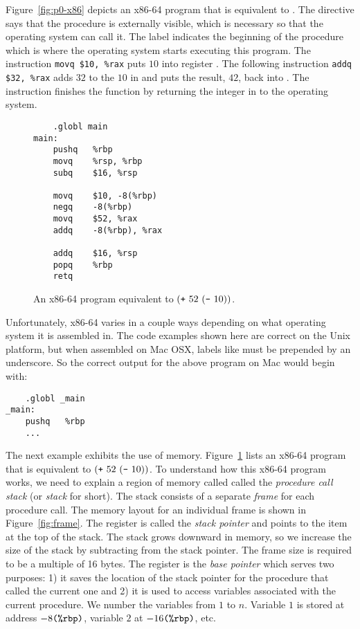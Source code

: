 \documentclass[11pt]{book}
\begin{document}
Figure~\ref{fig:p0-x86} depicts an x86-64 program that is equivalent
to . The  directive says that the
 procedure is externally visible, which is necessary so
that the operating system can call it. The label 
indicates the beginning of the  procedure which is where
the operating system starts executing this program.  The instruction
\lstinline{movq $10, %rax} puts $10$ into register . The
following instruction \lstinline{addq $32, %rax} adds $32$ to the
$10$ in  and puts the result, $42$, back into
. The instruction  finishes the 
function by returning the integer in  to the
operating system.


\begin{wrapfigure}{r}{2.25in}
\begin{lstlisting}
	.globl main
main:
	pushq	%rbp
	movq	%rsp, %rbp
	subq	$16, %rsp

	movq	$10, -8(%rbp)
	negq	-8(%rbp)
	movq	$52, %rax
	addq	-8(%rbp), %rax

	addq	$16, %rsp
	popq	%rbp
	retq
\end{lstlisting}
\caption{An x86-64 program equivalent to $(\texttt{+}~52~(\texttt{-}~10) )$.}
\label{fig:p1-x86}
\end{wrapfigure}

Unfortunately, x86-64 varies in a couple ways depending on what
operating system it is assembled in. The code examples shown here are
correct on the Unix platform, but when assembled on Mac OSX, labels
like  must be prepended by an underscore.  So the correct
output for the above program on Mac would begin with:

\begin{lstlisting}
	.globl _main
_main:
	pushq	%rbp
	...
\end{lstlisting}


The next example exhibits the use of memory.  Figure~\ref{fig:p1-x86}
lists an x86-64 program that is equivalent to $(\texttt{+}~52~
  (\texttt{-}~10) )$. To understand how this x86-64 program works, we
need to explain a region of memory called called the \emph{procedure
  call stack} (or \emph{stack} for short). The stack consists of a
separate \emph{frame} for each procedure call. The memory layout for
an individual frame is shown in Figure~\ref{fig:frame}.  The register
 is called the \emph{stack pointer} and points to the item at
the top of the stack. The stack grows downward in memory, so we
increase the size of the stack by subtracting from the stack
pointer. The frame size is required to be a multiple of 16 bytes. The
register  is the \emph{base pointer} which serves two
purposes: 1) it saves the location of the stack pointer for the
procedure that called the current one and 2) it is used to access
variables associated with the current procedure. We number the
variables from $1$ to $n$. Variable $1$ is stored at address
$-8\texttt{(\%rbp)}$, variable $2$ at $-16\texttt{(\%rbp)}$, etc.
\end{document}
